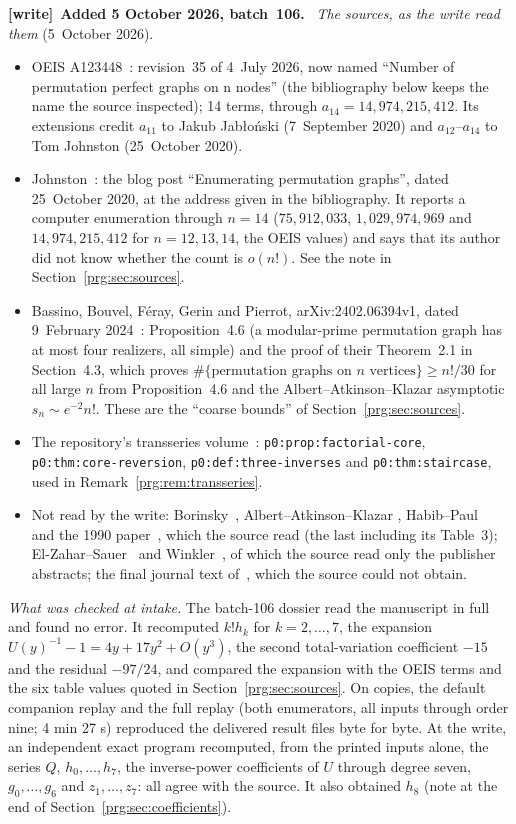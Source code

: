 \documentclass[11pt,letterpaper]{article}
\numberwithin{equation}{section}
\theoremstyle{definition}\newtheorem{definition}[theorem]{Definition}
\theoremstyle{remark}\newtheorem{remark}[theorem]{Remark}
\newcommand{\file}[1]{\nolinkurl{#1}}
\newenvironment{writenote}[1][]{\par\smallskip\begingroup\small
 \noindent\textbf{[write]}\if\relax\detokenize{#1}\relax\else~\textbf{#1.}\fi\ }%
 {\par\endgroup\smallskip}
\begin{document}
\begin{writenote}[Added 5 October 2026, batch~106]
\emph{The sources, as the write read them} (5~October 2026).
\begin{itemize}
\item OEIS A123448~\cite{OEIS}: revision~35 of 4~July 2026, now named
 ``Number of permutation perfect graphs on n nodes'' (the bibliography below
 keeps the name the source inspected); 14 terms, through
 $a_{14}=14{,}974{,}215{,}412$. Its extensions credit $a_{11}$ to Jakub
 Jab\l{}o\'nski (7~September 2020) and $a_{12}$--$a_{14}$ to Tom Johnston
 (25~October 2020).
\item Johnston~\cite{Johnston}: the blog post ``Enumerating permutation
 graphs'', dated 25~October 2020, at the address given in the bibliography.
 It reports a computer enumeration through $n=14$ ($75{,}912{,}033$,
 $1{,}029{,}974{,}969$ and $14{,}974{,}215{,}412$ for $n=12,13,14$, the OEIS
 values) and says that its author did not know whether the count is
 $o(n!)$. See the note in Section~\ref{prg:sec:sources}.
\item Bassino, Bouvel, F\'eray, Gerin and Pierrot, arXiv:2402.06394v1, dated
 9~February 2024~\cite{BBFGP}: Proposition~4.6 (a modular-prime permutation
 graph has at most four realizers, all simple) and the proof of their
 Theorem~2.1 in Section~4.3, which proves
 $\#\{\text{permutation graphs on $n$ vertices}\}\ge n!/30$ for all large
 $n$ from Proposition~4.6 and the Albert--Atkinson--Klazar asymptotic
 $s_n\sim e^{-2}n!$. These are the ``coarse bounds'' of
 Section~\ref{prg:sec:sources}.
\item The repository's transseries volume~\cite{TSI}:
 \file{p0:prop:factorial-core}, \file{p0:thm:core-reversion},
 \file{p0:def:three-inverses} and \file{p0:thm:staircase}, used in
 Remark~\ref{prg:rem:transseries}.
\item Not read by the write: Borinsky~\cite{Borinsky}, Albert--Atkinson--Klazar
 \cite{AAK}, Habib--Paul~\cite{HP} and the 1990 paper~\cite{BEK}, which the
 source read (the last including its Table~3); El-Zahar--Sauer~\cite{ES} and
 Winkler~\cite{Winkler}, of which the source read only the publisher
 abstracts; the final journal text of~\cite{BBFGP}, which the source could
 not obtain.
\end{itemize}

\emph{What was checked at intake.} The batch-106 dossier read the manuscript
in full and found no error. It recomputed $k!h_k$ for $k=2,\dots,7$, the
expansion $U(y)^{-1}-1=4y+17y^2+O(y^3)$, the second total-variation
coefficient $-15$ and the residual $-97/24$, and compared the expansion with
the OEIS terms and the six table values quoted in
Section~\ref{prg:sec:sources}. On copies, the default companion replay and
the full replay (both enumerators, all inputs through order nine; 4 min 27 s)
reproduced the delivered result files byte for byte. At the write, an
independent exact program recomputed, from the printed inputs alone, the
series $Q$, $h_0,\dots,h_7$, the inverse-power coefficients of $U$ through
degree seven, $g_0,\dots,g_6$ and $z_1,\dots,z_7$: all agree with the
source. It also obtained $h_8$ (note at the end of
Section~\ref{prg:sec:coefficients}).


\end{writenote}
\end{document}
